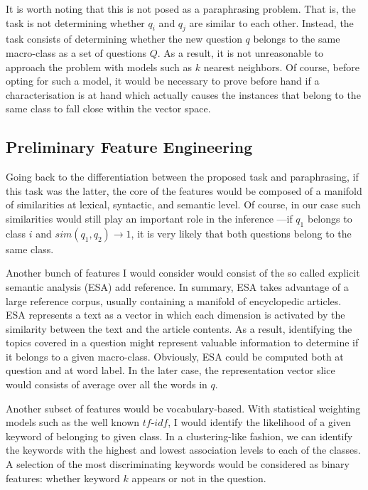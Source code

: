 \documentclass{sig-alternate-05-2015}
\newcommand{\abc}[1]{{\color{red} #1}}
\begin{document}
It is worth noting that this is not posed as a paraphrasing problem. That is, 
the task is not determining whether $q_i$ and $q_j$ are similar to each other. 
Instead, the task consists of determining whether the new question $q$ belongs 
to the same macro-class as a set of questions $Q$. As a result, it is not 
unreasonable to approach the problem with models such as $k$ nearest neighbors. 
Of course, before opting for such a model, it would be necessary to prove before 
hand if a characterisation is at hand which actually causes the instances that 
belong to the same class to fall close within the vector space. 

\subsection{Preliminary Feature Engineering}

Going back to the differentiation between the proposed task and paraphrasing, 
if this task was the latter, the core of the features would be composed of a 
manifold of similarities at lexical, syntactic, and semantic level. Of course, 
in our case such similarities would still play an important role in the 
inference ---if $q_1$ belongs to class $i$ and $sim(q_1,q_2)\rightarrow 1$, it 
is very likely that both questions belong to the same class. 

Another bunch of features I would consider would consist of the so called 
explicit semantic analysis (ESA)\abc{add reference}. In summary, ESA takes 
advantage of a large reference corpus, usually containing a manifold of 
encyclopedic articles. ESA represents a text as a vector in which each dimension 
is activated by the similarity between the text and the article contents. As a 
result, identifying the topics covered in a question might represent valuable 
information to determine if it belongs to a given macro-class. Obviously, ESA 
could be computed both at question and at word label. In the later case, the 
representation vector slice would consists of average over all the words in $q$.

Another subset of features would be vocabulary-based. With statistical weighting 
models such as the well known $tf$-$idf$, I would identify the likelihood of a 
given keyword of belonging to given class. In a clustering-like fashion, we can 
identify the keywords with the highest and lowest association levels to each of 
the classes. A selection of the most discriminating keywords would be considered 
as binary features: whether keyword $k$ appears or not in the question. 
\end{document}
